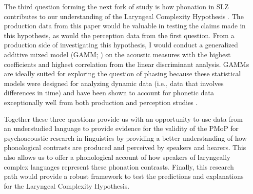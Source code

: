 \documentclass[12pt, letterpaper]{article}
\begin{document}
The third question forming the next fork of study is how phonation in SLZ contributes to our understanding of the Laryngeal Complexity Hypothesis \citep{silvermanLaryngealComplexityOtomanguean1997, blankenshipTimeCourseBreathiness1997, blankenshipTimingNonmodalPhonation2002}. The production data from this paper would be valuable in testing the claims made in this hypothesis, as would the perception data from the first question. From a production side of investigating this hypothesis, I would conduct a generalized additive mixed model (GAMM; \cite{hastieGeneralizedAdditiveModels1986, woodGeneralizedAdditiveModels2017}) on the acoustic measures with the highest coefficients and highest correlation from the linear discriminant analysis. GAMMs are ideally suited for exploring the question of phasing because these statistical models were designed for analyzing dynamic data (i.e., data that involves differences in time) and have been shown to account for phonetic data exceptionally well from both production and perception studies \citep{winterHowAnalyzeLinguistic2016,arnholdModellingInterplayMultiple2017,royIndividualDifferencesPatterns2017,soskuthyGeneralisedAdditiveMixed2017,wielingAnalyzingDynamicPhonetic2018,gonzalezGridlinesApproachDynamic2021,soskuthyEvaluatingGeneralisedAdditive2021,coetzeeProducingPerceivingSocially2022}. 

Together these three questions provide us with an opportunity to use data from an understudied language to provide evidence for the validity of the PMoP for psychoacoustic research in linguistics by providing a better understanding of how phonological contrasts are produced and perceived by speakers and hearers. This also allows us to offer a phonological account of how speakers of laryngeally complex languages represent these phonation contrasts. Finally, this research path would provide a robust framework to test the predictions and explanations for the Laryngeal Complexity Hypothesis. 

\printbibliography[heading=bibintoc]
\end{document}
